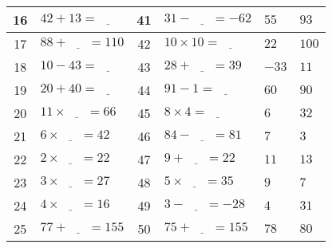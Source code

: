\documentclass[french,a4paper,10pt]{article}
\begin{document}
\begin{tabular}{|c|p{4cm}|c|p{4cm}||p{1cm}|p{1cm}|}
\hline
16 & $42 + 13 = \underline{\phantom{999}}$ & 41 & $31 - \underline{\phantom{999}} = -62$ & $55$ & $93$ \\
\hline
17 & $88 + \underline{\phantom{999}} = 110$ & 42 & $10 \times 10 = \underline{\phantom{999}}$ & $22$ & $100$ \\
\hline
18 & $10 - 43 = \underline{\phantom{999}}$ & 43 & $28 + \underline{\phantom{999}} = 39$ & $-33$ & $11$ \\
\hline
19 & $20 + 40 = \underline{\phantom{999}}$ & 44 & $91 - 1 = \underline{\phantom{999}}$ & $60$ & $90$ \\
\hline
20 & $11 \times \underline{\phantom{999}} = 66$ & 45 & $8 \times 4 = \underline{\phantom{999}}$ & $6$ & $32$ \\
\hline
21 & $6 \times \underline{\phantom{999}} = 42$ & 46 & $84 - \underline{\phantom{999}} = 81$ & $7$ & $3$ \\
\hline
22 & $2 \times \underline{\phantom{999}} = 22$ & 47 & $9 + \underline{\phantom{999}} = 22$ & $11$ & $13$ \\
\hline
23 & $3 \times \underline{\phantom{999}} = 27$ & 48 & $5 \times \underline{\phantom{999}} = 35$ & $9$ & $7$ \\
\hline
24 & $4 \times \underline{\phantom{999}} = 16$ & 49 & $3 - \underline{\phantom{999}} = -28$ & $4$ & $31$ \\
\hline
25 & $77 + \underline{\phantom{999}} = 155$ & 50 & $75 + \underline{\phantom{999}} = 155$ & $78$ & $80$ \\
\hline

\end{tabular}
\begin{center}
\end{center}                 
\end{document}
